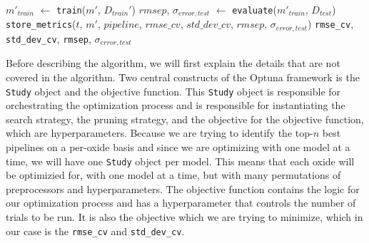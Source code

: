 \begin{algorithm}
\begin{algorithmic}[1]
    \Statex
    \State $m'_{train}$ $\gets$ \texttt{train}($m'$, $D_{train}'$) \label{step:train_model}
    \State $rmsep$, $\sigma_{error, test}$ $\gets$ \texttt{evaluate}($m'_{train}$, $D_{test}$) \label{step:evaluate_model}
    \Statex
    \State \texttt{store\_metrics}($t$, $m'$, $pipeline$, $rmse\_cv$, \newline \hspace*{8em}$std\_dev\_cv$, $rmsep$, $\sigma_{error, test}$) \label{step:store_metrics}
\EndFor
\State \Return \texttt{rmse\_cv}, \texttt{std\_dev\_cv}, \texttt{rmsep}, $\sigma_{error, test}$ \label{step:return_metrics}
\end{algorithmic}
\end{algorithm}

Before describing the algorithm, we will first explain the details that are not covered in the algorithm.
Two central constructs of the Optuna framework is the \texttt{Study} object and the objective function.
This \texttt{Study} object is responsible for orchestrating the optimization process and is responsible for instantiating the search strategy, the pruning strategy, and the objective for the objective function, which are hyperparameters.
Because we are trying to identify the top-$n$ best pipelines on a per-oxide basis and since we are optimizing with one model at a time, we will have one \texttt{Study} object per model.
This means that each oxide will be optimizied for, with one model at a time, but with many permutations of preprocessors and hyperparameters. 
The objective function contains the logic for our optimization process and has a hyperparameter that controls the number of trials to be run.
It is also the objective which we are trying to minimize, which in our case is the \texttt{rmse\_cv} and \texttt{std\_dev\_cv}.

